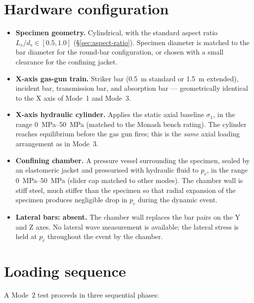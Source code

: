 \documentclass[11pt,a4paper,openany]{book}
\providecommand{\SI}[2]{\qty{#1}{#2}}
\providecommand{\SIrange}[3]{\qtyrange{#1}{#2}{#3}}
\theoremstyle{handbook}
\newcommand{\sig}{\sigma}
\begin{document}
\section{Hardware configuration}

\begin{itemize}[leftmargin=*,itemsep=3pt]
  \item \textbf{Specimen geometry.} Cylindrical, with the standard aspect
        ratio $L_s/d_s\in[0.5,1.0]$ (\S\ref{sec:aspect-ratio}). Specimen
        diameter is matched to the bar diameter for the round-bar
        configuration, or chosen with a small clearance for the
        confining jacket.
  \item \textbf{X-axis gas-gun train.} Striker bar (\SI{0.5}{m} standard
        or \SI{1.5}{m} extended), incident bar, transmission bar, and
        absorption bar --- geometrically identical to the X axis of
        Mode~1 and Mode~3.
  \item \textbf{X-axis hydraulic cylinder.} Applies the static axial
        baseline $\sig_1$, in the range \SIrange{0}{50}{MPa} (matched to
        the Monash bench rating). The cylinder reaches equilibrium
        before the gas gun fires; this is the \emph{same} axial loading
        arrangement as in Mode~3.
  \item \textbf{Confining chamber.} A pressure vessel surrounding the
        specimen, sealed by an elastomeric jacket and pressurised with
        hydraulic fluid to $p_c$, in the range
        \SIrange{0}{50}{MPa} (slider cap matched to other modes). The
        chamber wall is stiff steel, much stiffer than the specimen so
        that radial expansion of the specimen produces negligible drop
        in $p_c$ during the dynamic event.
  \item \textbf{Lateral bars: absent.} The chamber wall replaces the
        bar pairs on the Y and Z axes. No lateral wave measurement is
        available; the lateral stress is held at $p_c$ throughout the
        event by the chamber.
\end{itemize}

\section{Loading sequence}

A Mode~2 test proceeds in three sequential phases:
\end{document}
